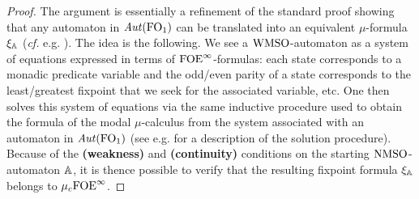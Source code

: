 \begin{proof} The argument is
 essentially a refinement of the standard proof showing that any automaton in $\mathit{Aut}(\mathrm{FO}_1)$ can be translated into an equivalent $\mu$-formula
$\xi_\mathbb{A}$ (\emph{cf.} e.g. \cite{Ven08}).
The idea is the following. We see a $\mathrm{WMSO}$-automaton as a system of equations expressed in terms of ${\mathrm{FOE}}^\infty$-formulas: each state corresponds to a monadic predicate variable and the odd/even parity of a state corresponds to the least/greatest fixpoint that we seek for the associated variable, etc. One then solves this system of equations via the same inductive procedure used to obtain the formula of the modal $\mu$-calculus from the system associated with an automaton in $\mathit{Aut}(\mathrm{FO}_1)$ (see e.g. \cite{ArnoldN01} for a description of the solution procedure). Because of the \textbf{(weakness)} and \textbf{(continuity)} conditions on the starting $\mathrm{NMSO}$-automaton $\mathbb{A}$, it is thence possible to verify that the resulting fixpoint formula $\xi_\mathbb{A}$ belongs to $\mu_{c}{\mathrm{FOE}}^\infty$.
%
\end{proof}
